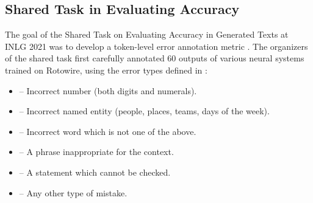 \subsection{Shared Task in Evaluating Accuracy}
\label{sec:tok-acc:st}
The goal of the Shared Task on Evaluating Accuracy in Generated Texts at INLG 2021 was to develop a token-level error annotation metric \cite{reiterSharedTaskEvaluating2020}. The organizers of the shared task first carefully annotated 60 outputs of various neural systems trained on Rotowire, using the error types defined in \citet{thomsonGoldStandardMethodology2020}:
\begin{itemize}
    \item {} --  Incorrect number (both digits and numerals).
    \item {} -- Incorrect named entity (people, places, teams, days of the week).
    \item {} -- Incorrect word which is not one of the above.
    \item {} --  A phrase inappropriate for the context.
    \item {} --  A statement which cannot be checked.
    \item {} --  Any other type of mistake.
\end{itemize}
